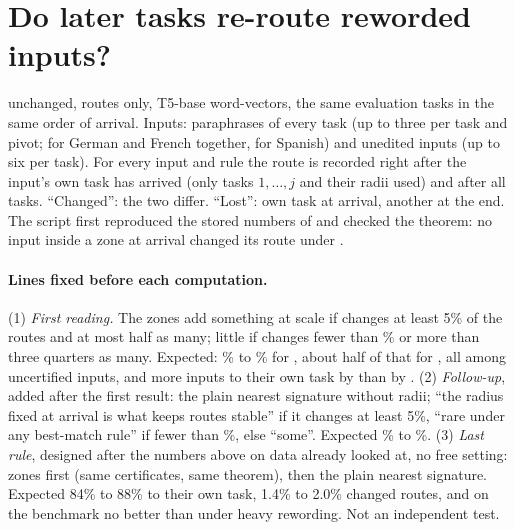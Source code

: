 \FloatBarrier
\section{Do later tasks re-route reworded inputs?}
\label{app:reroute}

\cert{} unchanged, routes only, T5-base word-vectors, the same \WidenTasksEval{} evaluation tasks in the same order of arrival. Inputs: paraphrases of every task (up to three per task and pivot; \RerouteInputs{} for German and French together, \RerouteInputsPivot{} for Spanish) and unedited inputs (up to six per task). For every input and rule the route is recorded right after the input's own task has arrived (only tasks $1,\dots,j$ and their radii used) and after all \WidenTasksEval{} tasks. ``Changed'': the two differ. ``Lost'': own task at arrival, another at the end. The script first reproduced the stored numbers of \cert{} and checked the theorem: no input inside a zone at arrival changed its route under \cert{}.

\paragraph{Lines fixed before each computation.} (1) \emph{First reading.} The zones add something at scale if \nearest{} changes at least 5\% of the routes and \cert{} at most half as many; little if \nearest{} changes fewer than \RerouteLimitLow{}\% or \cert{} more than three quarters as many. Expected: \RerouteExpectNearLow{}\% to \RerouteExpectNearHigh{}\% for \nearest{}, about half of that for \cert{}, all among uncertified inputs, and more inputs to their own task by \nearest{} than by \cert{}. (2) \emph{Follow-up}, added after the first result: the plain nearest signature without radii; ``the radius fixed at arrival is what keeps routes stable'' if it changes at least 5\%, ``rare under any best-match rule'' if fewer than \RerouteLimitLow{}\%, else ``some''. Expected \RerouteExpectSigLow{}\% to \RerouteExpectSigHigh{}\%. (3) \emph{Last rule}, designed after the numbers above on data already looked at, no free setting: zones first (same certificates, same theorem), then the plain nearest signature. Expected 84\% to 88\% to their own task, 1.4\% to 2.0\% changed routes, and on the benchmark no better than \cert{} under heavy rewording. Not an independent test.

